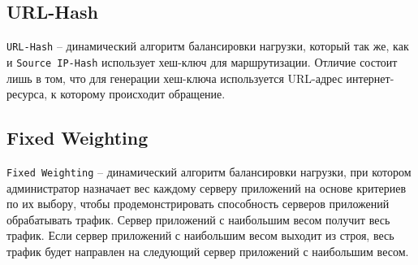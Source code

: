 \subsection{{URL-Hash}}

\texttt{URL-Hash} -- динамический алгоритм балансировки нагрузки, который так же, как и \texttt{Source IP-Hash} использует хеш-ключ для маршрутизации. Отличие состоит лишь в том, что для генерации хеш-ключа используется {URL}-адрес интернет-ресурса, к которому происходит обращение. \cite{wwwc}

\subsection{{Fixed Weighting}}

\texttt{Fixed Weighting} -- динамический алгоритм балансировки нагрузки, при котором администратор назначает вес каждому серверу приложений на основе критериев по их выбору, чтобы продемонстрировать способность серверов приложений обрабатывать трафик. Сервер приложений с наибольшим весом получит весь трафик. Если сервер приложений с наибольшим весом выходит из строя, весь трафик будет направлен на следующий сервер приложений с наибольшим весом. \cite{sdn5g}
